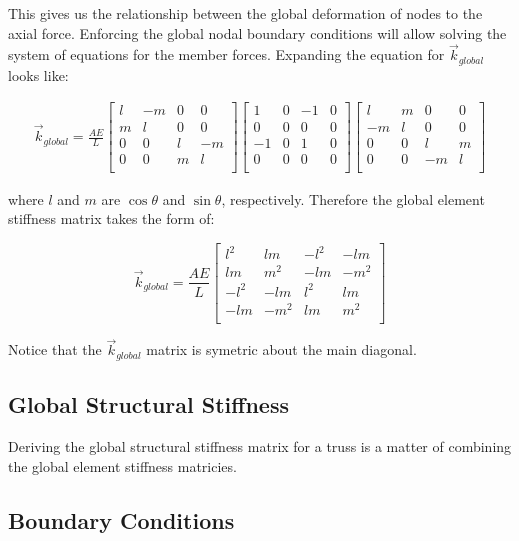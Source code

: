 This gives us the relationship between the global deformation of nodes to the axial force. Enforcing the global nodal boundary conditions will allow solving the system of equations for the member forces. Expanding the equation for $\vec{k}_{global}$ looks like:
\begin{strip}
\begin{align*}
\vec{k}_{global}
=
\frac{AE}{L}
	\begin{bmatrix}
  		l & -m & 0 & 0\\
  		m & l & 0 & 0\\
  		0 & 0 & l & -m\\
  		0 & 0 & m & l\\
	\end{bmatrix}
	\begin{bmatrix}
  		1 & 0 & -1 & 0\\
  		0 & 0 & 0 & 0\\
  		-1 & 0 & 1 & 0\\
  		0 & 0 & 0 & 0\\
	\end{bmatrix}
	\begin{bmatrix}
  		l & m & 0 & 0\\
  		-m & l & 0 & 0\\
  		0 & 0 & l & m\\
  		0 & 0 & -m & l\\
\end{bmatrix}
\end{align*}
\end{strip}

where $l$ and $m$ are $\cos\theta$ and $\sin\theta$, respectively. Therefore the global element stiffness matrix takes the form of:

\begin{equation}
\vec{k}_{global}
=
\frac{AE}{L}
	\begin{bmatrix}
  	l^2 & lm & -l^2 & -lm\\
  	lm & m^2 & -lm & -m^2\\
  	-l^2 & -lm & l^2 & lm\\
  	-lm & -m^2 & lm & m^2\\
	\end{bmatrix}
\end{equation}

Notice that the $\vec{k}_{global}$ matrix is  symetric about the main diagonal. 

\subsection{Global Structural Stiffness}

Deriving the global structural stiffness matrix for a truss is a matter of combining the global element stiffness matricies.

\subsection{Boundary Conditions}

